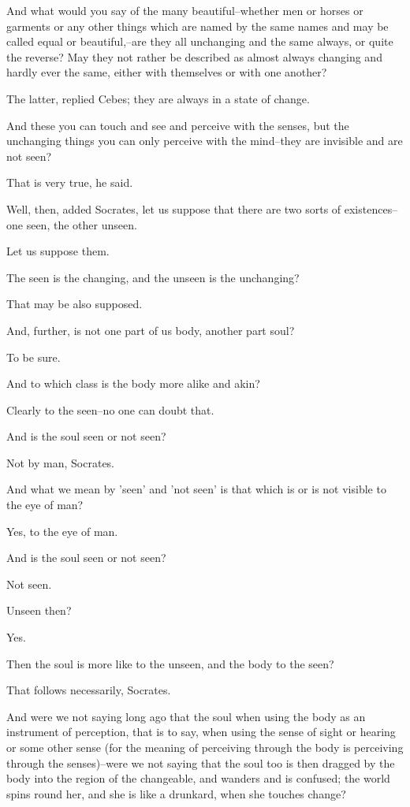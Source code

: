 And what would you say of the many beautiful--whether men or horses or
garments or any other things which are named by the same names and may
be called equal or beautiful,--are they all unchanging and the same
always, or quite the reverse? May they not rather be described as almost
always changing and hardly ever the same, either with themselves or with
one another?

The latter, replied Cebes; they are always in a state of change.

And these you can touch and see and perceive with the senses, but
the unchanging things you can only perceive with the mind--they are
invisible and are not seen?

That is very true, he said.

Well, then, added Socrates, let us suppose that there are two sorts of
existences--one seen, the other unseen.

Let us suppose them.

The seen is the changing, and the unseen is the unchanging?

That may be also supposed.

And, further, is not one part of us body, another part soul?

To be sure.

And to which class is the body more alike and akin?

Clearly to the seen--no one can doubt that.

And is the soul seen or not seen?

Not by man, Socrates.

And what we mean by 'seen' and 'not seen' is that which is or is not
visible to the eye of man?

Yes, to the eye of man.

And is the soul seen or not seen?

Not seen.

Unseen then?

Yes.

Then the soul is more like to the unseen, and the body to the seen?

That follows necessarily, Socrates.

And were we not saying long ago that the soul when using the body as an
instrument of perception, that is to say, when using the sense of sight
or hearing or some other sense (for the meaning of perceiving through
the body is perceiving through the senses)--were we not saying that the
soul too is then dragged by the body into the region of the changeable,
and wanders and is confused; the world spins round her, and she is like
a drunkard, when she touches change?

